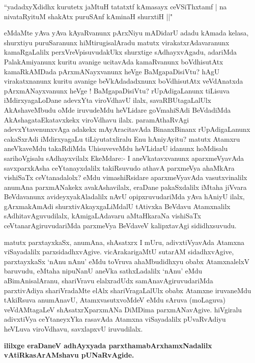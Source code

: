 \begin{shl}
``yadadxyXdidhx kurutetx jaMtuH tatatxtf kAmasayx ceVSiThxtamf |
na nivataRyituM shakAtx puruSAnf kAminaH shurxtiH ||"
\end{shl}

\begin{artha}
eMdaMte yAva yAva kAyaRvanunx pArxNiyu mADidarU adadu  kAmada kelasa,
shurxtiyu puruSaranunx hiMtirugisalAradu matutx virakatxrAdavaranunx
kamaRgaLalilx perxVreVpisuvudakUkx shurxtige sAdhayxvAgadu, adariMda
PalakAmiyanunx kuritu avanige ucitavAda kamaRvanunx boVdhisutAtx
kamaRkAMDada pArxmANayxvanunx heVge BaMgapaDisiVtu? hAgU virakatxnanunx
kuritu avanige beVkAdadadxnunx boVdhisutAtx veVdAnatxda pArxmANayxvanunx
heVge ! BaMgapaDisiVtu? rUpAdigaLanunx tiLisuva iMdirxyagaLoDane
adevxYta viroVdhavU ilalx, savaRBUtagaLalUlx AkAshaveMbudu
oMde iruvudeMdu heVLidare goVmahiSAdi BeVdadiMda AkAshagataEkatavxkekx
viroVdhavu ilalx. paramAthaRvAgi adevxYtavenunxvAga adakekx
mAyAracitavAda BinanxBinanx rUpAdigaLanunx cakaSxrAdi iMdirxyagaLu
tiLiyutatxliralu Enu hAniyAyitu? matutx Atamxru aneVkaveMdu
takaRdiMda UhisuveveMdu heVLidarU idanunx hoMdisalu sarihoVgisalu
sAdhayxvilalx EkeMdare:- I aneVkatavxvanunx aparxmeVyavAda
savxparxkAsha ceYtanayxdalilx takiRsuvudo athavA parxmeVya ahaMkAra
vishiSaTx ceVtanadalolx? eMdu vimashiRsidare aparxmeVyavAda
vasutxvinalilx anumAna parxmANakekx avakAshavilalx, eraDane
pakaSxdalilx iMtaha jiVvara BeVdavanunx avideyxyakAladalilx nAvU
opipxruvudariMda yAva hAniyU ilalx, gArxmakAmAdi shurxtivAkayxgaLiMdalU
tAtivxka BeVdavu Atamxnalilx sAdhitavAguvudilalx, kAmigaLAdavaru
aMtaHkaraNa vishiSaTx ceVtanarAgiruvudariMda parxmeVya BeVdaveV
kalipxtavAgi sididhxsuvudu.

matutx parxtayxkaSx, anumAna, shAsatxrx I mUru, adivxtiVyavAda Atamxna
viSayadalilx parxsidadhxvAgive. vicArakarigaMtU sutarAM sidadhxvAgive,
parxtayxkaSx `nAnu nAnu' eMdu toVruva ahaMbudidhxyu obabx AtamxnalelxV
baruvudu, eMtaha nipuNanU aneVka sathxLadalilx `nAnu' eMdu
aBimAnisalAranu, shariVravu elalxradUdx samAnavAgiruvudariMda
parxtivAdiya shariVradaMte elAlx shariVragaLalUlx obabx Atamxne
iruvaneMdu tAkiRsuva anumAnavU, AtamxvasutxvoMdeV eMdu sAruva
(moLaguva) veVdAMtagaLeV shAsatxrXparxmANa DiMDima
parxmANavAgive. hiVgiralu adivxtiVya ceYtaneyxYka rasavAda Atamxna
viSayadalilx pUvaRvAdiyu heVLuva viroVdhavu, savxlapxvU iruvudilalx.
\end{artha}

\begin{center}
\textbf{ililxge eraDaneV adhAyxyada parxthamabArxhamxNadalilx vAtiRkasArAMshavu pUNaRvAgide.}
\end{center}

